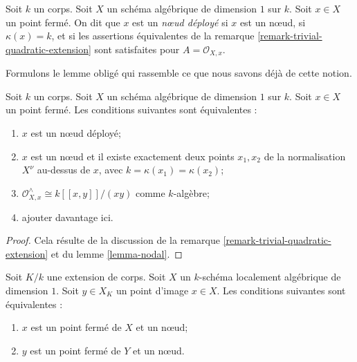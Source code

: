 \begin{definition}
\label{definition-split-node}
Soit $k$ un corps. Soit $X$ un schéma algébrique de dimension $1$ sur $k$. Soit $x \in X$ un point fermé. On dit que $x$ est un {\it nœud déployé} si $x$ est un nœud, si $\kappa(x) = k$, et si les assertions équivalentes de la remarque \ref{remark-trivial-quadratic-extension} sont satisfaites pour $A = \mathcal{O}_{X, x}$.
\end{definition}

\noindent
Formulons le lemme obligé qui rassemble ce que nous savons déjà de cette notion.

\begin{lemma}
\label{lemma-split-node}
Soit $k$ un corps. Soit $X$ un schéma algébrique de dimension $1$ sur $k$. Soit $x \in X$ un point fermé. Les conditions suivantes sont équivalentes : \begin{enumerate} \item $x$ est un nœud déployé; \item $x$ est un nœud et il existe exactement deux points $x_1, x_2$ de la normalisation $X^\nu$ au-dessus de $x$, avec $k = \kappa(x_1) = \kappa(x_2)$; \item $\mathcal{O}_{X, x}^\wedge \cong k[[x, y]]/(xy)$ comme $k$-algèbre; \item ajouter davantage ici.
\end{enumerate}
\end{lemma}

\begin{proof}
Cela résulte de la discussion de la remarque \ref{remark-trivial-quadratic-extension} et du lemme \ref{lemma-nodal}.
\end{proof}

\begin{lemma}
\label{lemma-node-field-extension}
Soit $K/k$ une extension de corps. Soit $X$ un $k$-schéma localement algébrique de dimension $1$. Soit $y \in X_K$ un point d'image $x \in X$. Les conditions suivantes sont équivalentes : \begin{enumerate} \item $x$ est un point fermé de $X$ et un nœud; \item $y$ est un point fermé de $Y$ et un nœud.
\end{enumerate}
\end{lemma}

